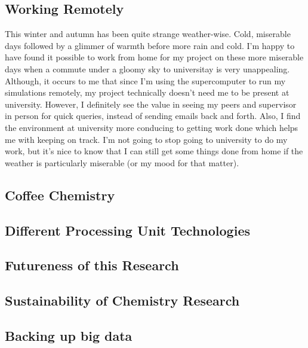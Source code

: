 \documentclass[11pt]{article}
\begin{document}
\subsection{Working Remotely}

This winter and autumn has been quite strange weather-wise. Cold, miserable days followed by a glimmer of warmth before more rain and cold. I'm happy to have found it possible to work from home for my project on these more miserable days when a commute under a gloomy sky to universitay is very unappealing. Although, it occurs to me that since I'm using the supercomputer to run my simulations remotely, my project technically doesn't need me to be present at university. However, I definitely see the value in seeing my peers and supervisor in person for quick queries, instead of sending emails back and forth. Also, I find the environment at university more conducing to getting work done which helps me with keeping on track. I'm not going to stop going to university to do my work, but it's nice to know that I can still get some things done from home if the weather is particularly miserable (or my mood for that matter). 

\subsection{Coffee Chemistry}
\subsection{Different Processing Unit Technologies}
\subsection{Futureness of this Research}
\subsection{Sustainability of Chemistry Research}



\subsection{Backing up big data}
\end{document}
